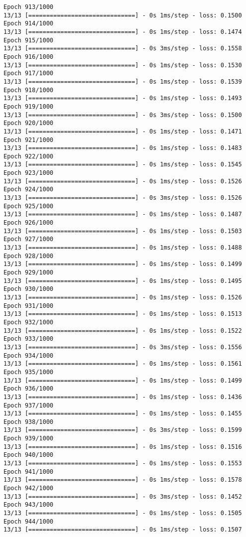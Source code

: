 \documentclass[11pt]{article}
\begin{document}
\begin{Verbatim}[commandchars=\\\{\}]
Epoch 913/1000
13/13 [==============================] - 0s 1ms/step - loss: 0.1500
Epoch 914/1000
13/13 [==============================] - 0s 1ms/step - loss: 0.1474
Epoch 915/1000
13/13 [==============================] - 0s 3ms/step - loss: 0.1558
Epoch 916/1000
13/13 [==============================] - 0s 1ms/step - loss: 0.1530
Epoch 917/1000
13/13 [==============================] - 0s 1ms/step - loss: 0.1539
Epoch 918/1000
13/13 [==============================] - 0s 1ms/step - loss: 0.1493
Epoch 919/1000
13/13 [==============================] - 0s 3ms/step - loss: 0.1500
Epoch 920/1000
13/13 [==============================] - 0s 1ms/step - loss: 0.1471
Epoch 921/1000
13/13 [==============================] - 0s 1ms/step - loss: 0.1483
Epoch 922/1000
13/13 [==============================] - 0s 1ms/step - loss: 0.1545
Epoch 923/1000
13/13 [==============================] - 0s 1ms/step - loss: 0.1526
Epoch 924/1000
13/13 [==============================] - 0s 3ms/step - loss: 0.1526
Epoch 925/1000
13/13 [==============================] - 0s 1ms/step - loss: 0.1487
Epoch 926/1000
13/13 [==============================] - 0s 1ms/step - loss: 0.1503
Epoch 927/1000
13/13 [==============================] - 0s 1ms/step - loss: 0.1488
Epoch 928/1000
13/13 [==============================] - 0s 1ms/step - loss: 0.1499
Epoch 929/1000
13/13 [==============================] - 0s 1ms/step - loss: 0.1495
Epoch 930/1000
13/13 [==============================] - 0s 1ms/step - loss: 0.1526
Epoch 931/1000
13/13 [==============================] - 0s 1ms/step - loss: 0.1513
Epoch 932/1000
13/13 [==============================] - 0s 1ms/step - loss: 0.1522
Epoch 933/1000
13/13 [==============================] - 0s 3ms/step - loss: 0.1556
Epoch 934/1000
13/13 [==============================] - 0s 1ms/step - loss: 0.1561
Epoch 935/1000
13/13 [==============================] - 0s 1ms/step - loss: 0.1499
Epoch 936/1000
13/13 [==============================] - 0s 1ms/step - loss: 0.1436
Epoch 937/1000
13/13 [==============================] - 0s 1ms/step - loss: 0.1455
Epoch 938/1000
13/13 [==============================] - 0s 3ms/step - loss: 0.1599
Epoch 939/1000
13/13 [==============================] - 0s 1ms/step - loss: 0.1516
Epoch 940/1000
13/13 [==============================] - 0s 1ms/step - loss: 0.1553
Epoch 941/1000
13/13 [==============================] - 0s 1ms/step - loss: 0.1578
Epoch 942/1000
13/13 [==============================] - 0s 3ms/step - loss: 0.1452
Epoch 943/1000
13/13 [==============================] - 0s 1ms/step - loss: 0.1505
Epoch 944/1000
13/13 [==============================] - 0s 1ms/step - loss: 0.1507

\end{Verbatim}
\end{document}
